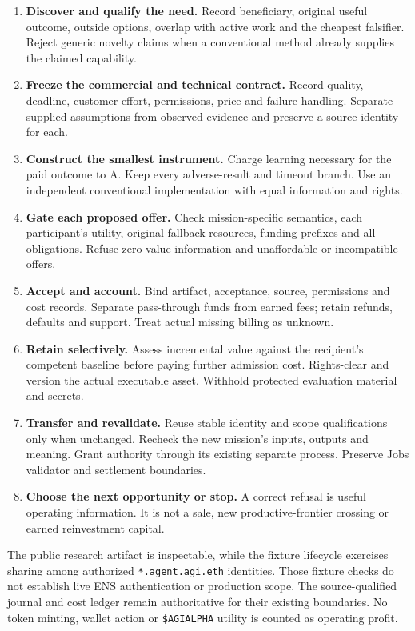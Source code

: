 \documentclass[11pt,letterpaper]{article}
\providecommand{\tightlist}{\setlength{\itemsep}{0pt}\setlength{\parskip}{0pt}}
\begin{document}
\begin{enumerate}
\def\labelenumi{\arabic{enumi}.}
\tightlist
\item
  \textbf{Discover and qualify the need.} Record beneficiary, original
  useful outcome, outside options, overlap with active work and the
  cheapest falsifier. Reject generic novelty claims when a conventional
  method already supplies the claimed capability.
\item
  \textbf{Freeze the commercial and technical contract.} Record quality,
  deadline, customer effort, permissions, price and failure handling.
  Separate supplied assumptions from observed evidence and preserve a
  source identity for each.
\item
  \textbf{Construct the smallest instrument.} Charge learning necessary
  for the paid outcome to A. Keep every adverse-result and timeout
  branch. Use an independent conventional implementation with equal
  information and rights.
\item
  \textbf{Gate each proposed offer.} Check mission-specific semantics,
  each participant's utility, original fallback resources, funding
  prefixes and all obligations. Refuse zero-value information and
  unaffordable or incompatible offers.
\item
  \textbf{Accept and account.} Bind artifact, acceptance, source,
  permissions and cost records. Separate pass-through funds from earned
  fees; retain refunds, defaults and support. Treat actual missing
  billing as unknown.
\item
  \textbf{Retain selectively.} Assess incremental value against the
  recipient's competent baseline before paying further admission cost.
  Rights-clear and version the actual executable asset. Withhold
  protected evaluation material and secrets.
\item
  \textbf{Transfer and revalidate.} Reuse stable identity and scope
  qualifications only when unchanged. Recheck the new mission's inputs,
  outputs and meaning. Grant authority through its existing separate
  process. Preserve Jobs validator and settlement boundaries.
\item
  \textbf{Choose the next opportunity or stop.} A correct refusal is
  useful operating information. It is not a sale, new
  productive-frontier crossing or earned reinvestment capital.
\end{enumerate}

The public research artifact is inspectable, while the fixture lifecycle
exercises sharing among authorized \texttt{*.agent.agi.eth} identities.
Those fixture checks do not establish live ENS authentication or
production scope. The source-qualified journal and cost ledger remain
authoritative for their existing boundaries. No token minting, wallet
action or \texttt{\$AGIALPHA} utility is counted as operating profit.
\end{document}
